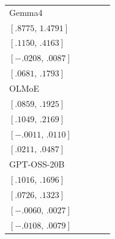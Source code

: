 \begin{tabular*}{\linewidth}{@{\extracolsep{\fill}}lcccc@{}}
Gemma4 & \begin{tabular}[t]{@{}c@{}}\(1.1705\)\\[-1pt]\([.8775,\,1.4791]\)\end{tabular} & \begin{tabular}[t]{@{}c@{}}\(.2586\)\\[-1pt]\([.1150,\,.4163]\)\end{tabular} & \begin{tabular}[t]{@{}c@{}}\(-.0061\)\\[-1pt]\([-.0208,\,.0087]\)\end{tabular} & \begin{tabular}[t]{@{}c@{}}\(.1188\)\\[-1pt]\([.0681,\,.1793]\)\end{tabular}\\[0.5pt]
OLMoE & \begin{tabular}[t]{@{}c@{}}\(.1368\)\\[-1pt]\([.0859,\,.1925]\)\end{tabular} & \begin{tabular}[t]{@{}c@{}}\(.1586\)\\[-1pt]\([.1049,\,.2169]\)\end{tabular} & \begin{tabular}[t]{@{}c@{}}\(.0050\)\\[-1pt]\([-.0011,\,.0110]\)\end{tabular} & \begin{tabular}[t]{@{}c@{}}\(.0349\)\\[-1pt]\([.0211,\,.0487]\)\end{tabular}\\[0.5pt]
GPT-OSS-20B & \begin{tabular}[t]{@{}c@{}}\(.1352\)\\[-1pt]\([.1016,\,.1696]\)\end{tabular} & \begin{tabular}[t]{@{}c@{}}\(.1019\)\\[-1pt]\([.0726,\,.1323]\)\end{tabular} & \begin{tabular}[t]{@{}c@{}}\(-.0017\)\\[-1pt]\([-.0060,\,.0027]\)\end{tabular} & \begin{tabular}[t]{@{}c@{}}\(-.0014\)\\[-1pt]\([-.0108,\,.0079]\)\end{tabular}\\[0.5pt]

\end{tabular*}
